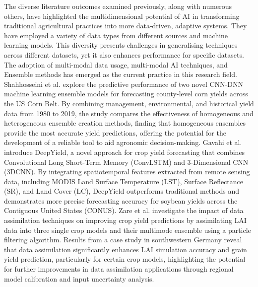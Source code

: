 The diverse literature outcomes examined previously, along with numerous others, have highlighted the multidimensional potential of AI in transforming traditional agricultural practices into more data-driven, adaptive systems. They have employed a variety of data types from different sources and machine learning models. This diversity presents challenges in generalising techniques across different datasets, yet it also enhances performance for specific datasets. The adoption of multi-modal data usage, multi-modal AI techniques, and Ensemble methods has emerged as the current practice in this research field. Shahhosseini et al. \cite{shahhosseini2021corn} explore the predictive performance of two novel CNN-DNN machine learning ensemble models for forecasting county-level corn yields across the US Corn Belt. By combining management, environmental, and historical yield data from 1980 to 2019, the study compares the effectiveness of homogeneous and heterogeneous ensemble creation methods, finding that homogeneous ensembles provide the most accurate yield predictions, offering the potential for the development of a reliable tool to aid agronomic decision-making. Gavahi et al. \cite{gavahi2021deepyield} introduce DeepYield, a novel approach for crop yield forecasting that combines Convolutional Long Short-Term Memory (ConvLSTM) and 3-Dimensional CNN (3DCNN). By integrating spatiotemporal features extracted from remote sensing data, including MODIS Land Surface Temperature (LST), Surface Reflectance (SR), and Land Cover (LC), DeepYield outperforms traditional methods and demonstrates more precise forecasting accuracy for soybean yields across the Contiguous United States (CONUS). Zare et al. \cite{zare2024within} investigate the impact of data assimilation techniques on improving crop yield predictions by assimilating LAI data into three single crop models and their multimode ensemble using a particle filtering algorithm. Results from a case study in southwestern Germany reveal that data assimilation significantly enhances LAI simulation accuracy and grain yield prediction, particularly for certain crop models, highlighting the potential for further improvements in data assimilation applications through regional model calibration and input uncertainty analysis.

